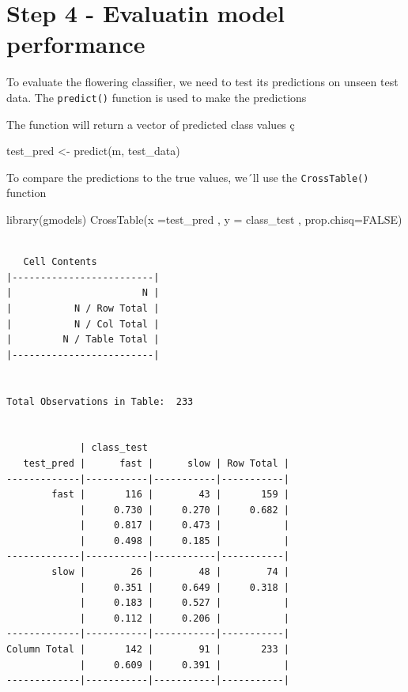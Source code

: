\documentclass[
]{article}
\newenvironment{Shaded}{\begin{snugshade}}{\end{snugshade}}
\newcommand{\AttributeTok}[1]{\textcolor[rgb]{0.77,0.63,0.00}{#1}}
\newcommand{\ConstantTok}[1]{\textcolor[rgb]{0.00,0.00,0.00}{#1}}
\newcommand{\FunctionTok}[1]{\textcolor[rgb]{0.00,0.00,0.00}{#1}}
\newcommand{\NormalTok}[1]{#1}
\newcommand{\OtherTok}[1]{\textcolor[rgb]{0.56,0.35,0.01}{#1}}
\begin{document}
\hypertarget{step-4---evaluatin-model-performance}{%
\section{Step 4 - Evaluatin model
performance}\label{step-4---evaluatin-model-performance}}

To evaluate the flowering classifier, we need to test its predictions on
unseen test data. The \texttt{predict()} function is used to make the
predictions

The function will return a vector of predicted class values ç

\begin{Shaded}
\begin{Highlighting}[]
\NormalTok{test\_pred }\OtherTok{\textless{}{-}} \FunctionTok{predict}\NormalTok{(m, test\_data)}
\end{Highlighting}
\end{Shaded}

To compare the predictions to the true values, we´ll use the
\texttt{CrossTable()} function

\begin{Shaded}
\begin{Highlighting}[]
\FunctionTok{library}\NormalTok{(gmodels)}
\FunctionTok{CrossTable}\NormalTok{(}\AttributeTok{x =}\NormalTok{test\_pred , }\AttributeTok{y =}\NormalTok{ class\_test , }\AttributeTok{prop.chisq=}\ConstantTok{FALSE}\NormalTok{)}
\end{Highlighting}
\end{Shaded}

\begin{verbatim}
 
   Cell Contents
|-------------------------|
|                       N |
|           N / Row Total |
|           N / Col Total |
|         N / Table Total |
|-------------------------|

 
Total Observations in Table:  233 

 
             | class_test 
   test_pred |      fast |      slow | Row Total | 
-------------|-----------|-----------|-----------|
        fast |       116 |        43 |       159 | 
             |     0.730 |     0.270 |     0.682 | 
             |     0.817 |     0.473 |           | 
             |     0.498 |     0.185 |           | 
-------------|-----------|-----------|-----------|
        slow |        26 |        48 |        74 | 
             |     0.351 |     0.649 |     0.318 | 
             |     0.183 |     0.527 |           | 
             |     0.112 |     0.206 |           | 
-------------|-----------|-----------|-----------|
Column Total |       142 |        91 |       233 | 
             |     0.609 |     0.391 |           | 
-------------|-----------|-----------|-----------|

 
\end{verbatim}
\end{document}
